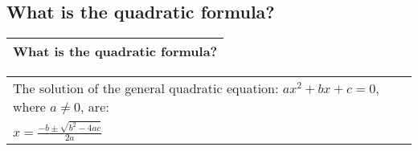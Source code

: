 \subsection{What is the quadratic formula?}
\begin{small}
    \begin{tabularx}{1\textwidth}{
            p{}
        }
        \toprule
            What is the quadratic formula?
        \\
        \bottomrule
    \end{tabularx}
\end{small}
\begin{small}
    \begin{tabularx}{1\textwidth}{
            p{}
        }
        \toprule
        The solution of the general quadratic equation: $ax^2 + bx + c = 0$,
        where $a\neq0$, are: \\
        $ x = \frac{-b \pm \sqrt{b^2 - 4ac}}{2a} $
        \\
        \bottomrule

    \end{tabularx}
\end{small}
